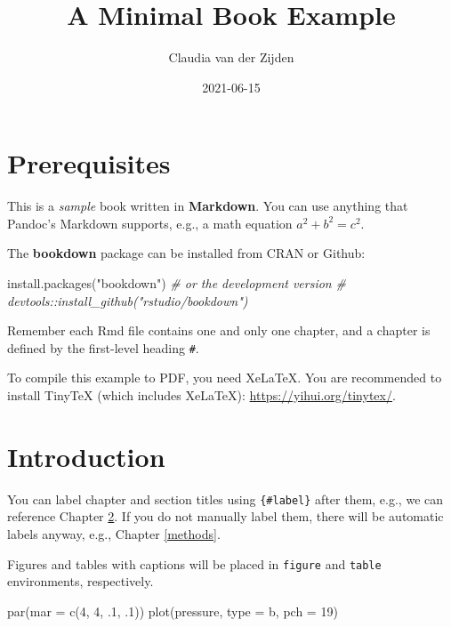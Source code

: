 \documentclass[
]{book}
\title{A Minimal Book Example}
\author{Claudia van der Zijden}
\date{2021-06-15}
\newenvironment{Shaded}{\begin{snugshade}}{\end{snugshade}}
\newcommand{\AttributeTok}[1]{\textcolor[rgb]{0.77,0.63,0.00}{#1}}
\newcommand{\CommentTok}[1]{\textcolor[rgb]{0.56,0.35,0.01}{\textit{#1}}}
\newcommand{\DecValTok}[1]{\textcolor[rgb]{0.00,0.00,0.81}{#1}}
\newcommand{\FunctionTok}[1]{\textcolor[rgb]{0.00,0.00,0.00}{#1}}
\newcommand{\NormalTok}[1]{#1}
\newcommand{\StringTok}[1]{\textcolor[rgb]{0.31,0.60,0.02}{#1}}
\begin{document}
\maketitle

{
\setcounter{tocdepth}{1}
\tableofcontents
}
\hypertarget{prerequisites}{%
\chapter{Prerequisites}\label{prerequisites}}

This is a \emph{sample} book written in \textbf{Markdown}. You can use anything that Pandoc's Markdown supports, e.g., a math equation \(a^2 + b^2 = c^2\).

The \textbf{bookdown} package can be installed from CRAN or Github:

\begin{Shaded}
\begin{Highlighting}[]
\FunctionTok{install.packages}\NormalTok{(}\StringTok{"bookdown"}\NormalTok{)}
\CommentTok{\# or the development version}
\CommentTok{\# devtools::install\_github("rstudio/bookdown")}
\end{Highlighting}
\end{Shaded}

Remember each Rmd file contains one and only one chapter, and a chapter is defined by the first-level heading \texttt{\#}.

To compile this example to PDF, you need XeLaTeX. You are recommended to install TinyTeX (which includes XeLaTeX): \url{https://yihui.org/tinytex/}.

\hypertarget{intro}{%
\chapter{Introduction}\label{intro}}

You can label chapter and section titles using \texttt{\{\#label\}} after them, e.g., we can reference Chapter \ref{intro}. If you do not manually label them, there will be automatic labels anyway, e.g., Chapter \ref{methods}.

Figures and tables with captions will be placed in \texttt{figure} and \texttt{table} environments, respectively.

\begin{Shaded}
\begin{Highlighting}[]
\FunctionTok{par}\NormalTok{(}\AttributeTok{mar =} \FunctionTok{c}\NormalTok{(}\DecValTok{4}\NormalTok{, }\DecValTok{4}\NormalTok{, .}\DecValTok{1}\NormalTok{, .}\DecValTok{1}\NormalTok{))}
\FunctionTok{plot}\NormalTok{(pressure, }\AttributeTok{type =} \StringTok{\textquotesingle{}b\textquotesingle{}}\NormalTok{, }\AttributeTok{pch =} \DecValTok{19}\NormalTok{)}
\end{Highlighting}
\end{Shaded}
\end{document}

